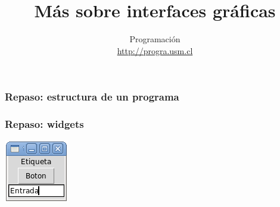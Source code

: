\documentclass[12pt]{beamer}
\title{Más sobre interfaces gráficas}
\author{Programación \\ \url{http://progra.usm.cl}}
\date{}
\begin{document}
  \begin{frame}
    \maketitle
  \end{frame}

  \begin{frame}
    \label{repaso-estructura}
    \frametitle{Repaso: estructura de un programa}
    \LARGE
    
  \end{frame}

  \begin{frame}
    \label{repaso-widgets}
    \frametitle{Repaso: widgets}
    \hfil
    \includegraphics[width=.5\textwidth]{programas/tkinter/capturas/widgets.png}
    \hfil
  \end{frame}
\end{document}
